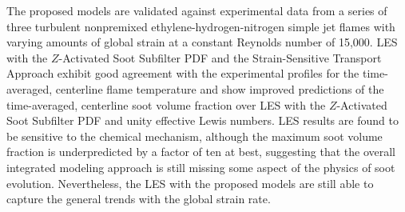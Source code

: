 The proposed models are validated against experimental data from a series of three turbulent nonpremixed ethylene-hydrogen-nitrogen simple jet flames with varying amounts of global strain at a constant Reynolds number of 15,000. LES with the $Z$-Activated Soot Subfilter PDF and the Strain-Sensitive Transport Approach exhibit good agreement with the experimental profiles for the time-averaged, centerline flame temperature and show improved predictions of the time-averaged, centerline soot volume fraction over LES with the $Z$-Activated Soot Subfilter PDF and unity effective Lewis numbers. LES results are found to be sensitive to the chemical mechanism, although the maximum soot volume fraction is underpredicted by a factor of ten at best, suggesting that the overall integrated modeling approach is still missing some aspect of the physics of soot evolution. Nevertheless, the LES with the proposed models are still able to capture the general trends with the global strain rate. 



